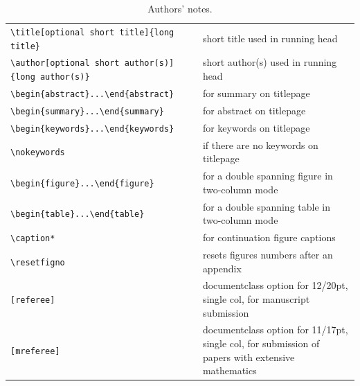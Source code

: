 \documentclass{gji}
\begin{document}
\begin{table}
\begin{minipage}{130mm}
\caption{Authors' notes.}
\label{authors}
\begin{tabular}{@{}ll}
\verb"\title[optional short title]{long title}"
                    & short title used in running head\\
\verb"\author[optional short author(s)]{long author(s)}"
                    & short author(s) used in running head\\
\verb"\begin{abstract}...\end{abstract}"& for summary on
titlepage\\
\verb"\begin{summary}...\end{summary}"& for abstract on
titlepage\\
\verb"\begin{keywords}...\end{keywords}"& for keywords on titlepage\\
\verb"\nokeywords"  & if there are no keywords on titlepage\\
\verb"\begin{figure}...\end{figure}" & for a double spanning figure in two-column mode\\
\verb"\begin{table}...\end{table}" & for a double spanning table in
                                       two-column mode\\
\verb"\caption*"    & for continuation figure captions\\
\verb"\resetfigno" & resets figures numbers after an appendix\\
\verb"[referee]" & documentclass option for 12/20pt, single col,
                   for manuscript submission\\
\verb"[mreferee]" & documentclass option for 11/17pt, single col,
                   for submission of papers with extensive mathematics\\
\end{tabular}
\end{minipage}
\end{table}
%
\end{document}
